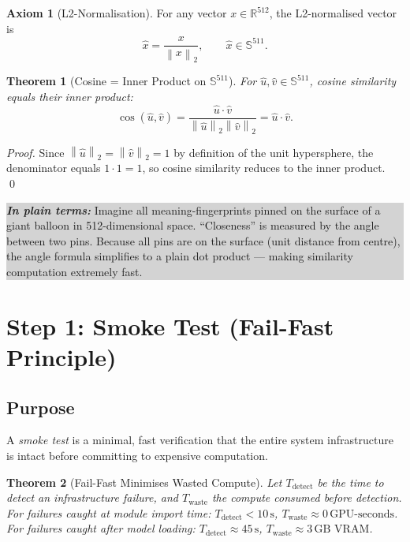 \documentclass[12pt, a4paper]{article}
\theoremstyle{definition}
\newtheorem{axiom}{Axiom}[section]
\theoremstyle{plain}
\newtheorem{theorem}{Theorem}[section]
\theoremstyle{remark}
\newcommand{\R}{\mathbb{R}}
\newcommand{\Sphere}{\mathbb{S}}
\newcommand{\norm}[1]{\left\|#1\right\|_2}
\newcommand{\layman}[1]{%
  \vspace{4pt}%
  \noindent\colorbox{lightgray}{\parbox{\dimexpr\linewidth-2\fboxsep}{%
    \textbf{\textit{In plain terms:}} #1}}%
  \vspace{4pt}%
}
\begin{document}
\begin{axiom}[L2-Normalisation]
For any vector $x \in \R^{512}$, the L2-normalised vector is
\[
\hat{x} = \frac{x}{\norm{x}}, \qquad \hat{x} \in \Sphere^{511}.
\]
\end{axiom}

\begin{theorem}[Cosine = Inner Product on $\Sphere^{511}$]
For $\hat{u}, \hat{v} \in \Sphere^{511}$, cosine similarity equals their inner product:
\[
\cos(\hat{u}, \hat{v}) = \frac{\hat{u} \cdot \hat{v}}{\norm{\hat{u}}\norm{\hat{v}}} = \hat{u} \cdot \hat{v}.
\]
\end{theorem}

\begin{proof}
Since $\norm{\hat{u}} = \norm{\hat{v}} = 1$ by definition of the unit hypersphere, the denominator equals $1 \cdot 1 = 1$, so cosine similarity reduces to the inner product. \qed
\end{proof}

\layman{Imagine all meaning-fingerprints pinned on the surface of a giant balloon in 512-dimensional space. ``Closeness'' is measured by the angle between two pins. Because all pins are on the surface (unit distance from centre), the angle formula simplifies to a plain dot product --- making similarity computation extremely fast.}

\section{Step 1: Smoke Test (Fail-Fast Principle)}
\label{sec:smoketest}

\subsection{Purpose}

A \emph{smoke test} is a minimal, fast verification that the entire system infrastructure is intact before committing to expensive computation.

\begin{theorem}[Fail-Fast Minimises Wasted Compute]
\label{thm:failfast}
Let $T_{\text{detect}}$ be the time to detect an infrastructure failure, and $T_{\text{waste}}$ the compute consumed before detection. For failures caught at module import time: $T_{\text{detect}} < 10\,\text{s}$, $T_{\text{waste}} \approx 0\,\text{GPU-seconds}$. For failures caught after model loading: $T_{\text{detect}} \approx 45\,\text{s}$, $T_{\text{waste}} \approx 3\,\text{GB VRAM}$.
\end{theorem}
\end{document}
